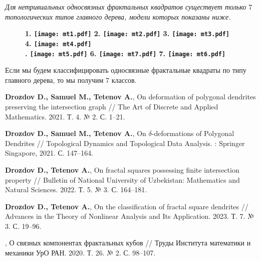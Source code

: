 \documentclass[a5paper,9pt,twoside]{extarticle} %
\begin{document}
{\em Для нетривиальных односвязных фрактальных квадратов существует только $7$ топологических типов главного дерева, модели которых показаны ниже.}
\begin{figure}[H]
\centering \Large {\bf
1. \texttt{[image: mt1.pdf]}
\hfill
2. \texttt{[image: mt2.pdf]}
\hfill
3. \texttt{[image: mt3.pdf]}
\hfill
4. \texttt{[image: mt4.pdf]}\\
. \texttt{[image: mt5.pdf]}
\hfill
6. \texttt{[image: mt7.pdf]}
\hfill
7. \texttt{[image: mt6.pdf]}}
\end{figure}

Если мы будем классифицировать односвязные фрактальные квадраты по типу главного дерева, то мы получим 7 классов.







\begin{thebibliography}{9}

{\bf Drozdov D., Samuel M., Tetenov A.},
On deformation of polygonal dendrites preserving the intersection graph //
The Art of Discrete and Applied Mathematics. 2021. Т. 4. № 2. С. 1--21.

{\bf Drozdov D., Samuel M., Tetenov A.},
On $\delta$-deformations of Polygonal Dendrites //
Topological Dynamics and Topological Data Analysis. : Springer Singapore, 2021. С. 147--164.

{\bf Drozdov D., Tetenov A.},
On fractal squares possessing finite intersection property //
Bulletin of National University of Uzbekistan: Mathematics and Natural Sciences. 2022. Т. 5. № 3. С. 164--181.

{\bf Drozdov D., Tetenov A.},
On the classification of fractal square dendrites //
Advances in the Theory of Nonlinear Analysis and Its Application. 2023. Т. 7. № 3. С. 19--96.

,
О связных компонентах фрактальных кубов //
Труды Института математики и механики УрО РАН. 2020. Т. 26. № 2. С. 98--107.


\end{thebibliography}
\end{document}
